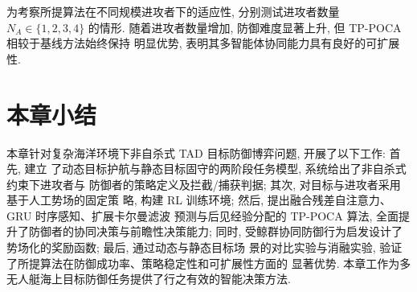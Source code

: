 为考察所提算法在不同规模进攻者下的适应性, 分别测试进攻者数量 $N_A\in\{1,2,3,4\}$
的情形. 随着进攻者数量增加, 防御难度显著上升, 但 TP-POCA 相较于基线方法始终保持
明显优势, 表明其多智能体协同能力具有良好的可扩展性.

\section{本章小结}
\label{sec:tad_summary}
本章针对复杂海洋环境下非自杀式 TAD 目标防御博弈问题, 开展了以下工作: 首先, 建立
了动态目标护航与静态目标固守的两阶段任务模型, 系统给出了非自杀式约束下进攻者与
防御者的策略定义及拦截/捕获判据; 其次, 对目标与进攻者采用基于人工势场的固定策
略, 构建 RL 训练环境; 然后, 提出融合残差自注意力、GRU 时序感知、扩展卡尔曼滤波
预测与后见经验分配的 TP-POCA 算法, 全面提升了防御者的协同决策与前瞻性决策能力;
同时, 受鲸群协同防御行为启发设计了势场化的奖励函数; 最后, 通过动态与静态目标场
景的对比实验与消融实验, 验证了所提算法在防御成功率、策略稳定性和可扩展性方面的
显著优势. 本章工作为多无人艇海上目标防御任务提供了行之有效的智能决策方法.
